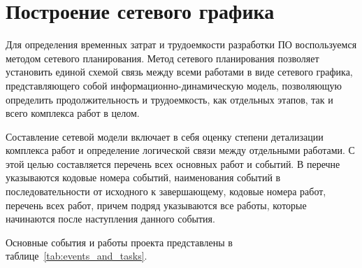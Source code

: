 \section{Построение сетевого графика}
Для определения временных затрат и трудоемкости разработки ПО воспользуемся
методом сетевого планирования. Метод сетевого планирования позволяет
установить единой схемой связь между всеми работами в виде сетевого графика,
представляющего собой информационно-динамическую модель, позволяющую
определить продолжительность и трудоемкость, как отдельных этапов, так и всего
комплекса работ в целом.

Составление сетевой модели включает в себя оценку степени детализации
комплекса работ и определение логической связи между отдельными работами. С
этой целью составляется перечень всех основных работ и событий. В перечне
указываются кодовые номера событий, наименования событий в последовательности
от исходного к завершающему, кодовые номера работ, перечень всех работ, причем
подряд указываются все работы, которые начинаются после наступления данного
события.

Основные события и работы проекта представлены в таблице~\ref{tab:events_and_tasks}.

